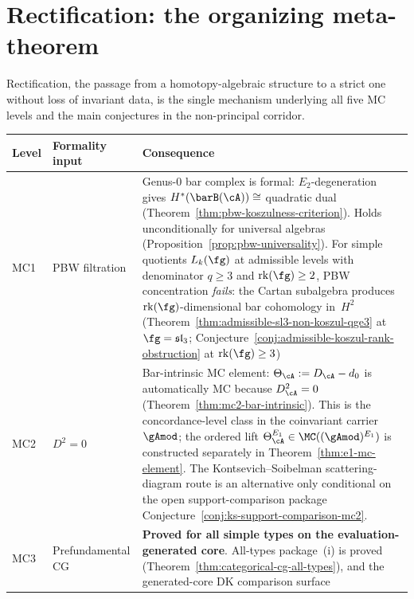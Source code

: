 \section{Rectification: the organizing meta-theorem}
\label{sec:concordance-rectification}

Rectification, the passage from a homotopy-algebraic structure
to a strict one without loss of invariant data, is the single
mechanism underlying all five MC levels and the main conjectures
in the non-principal corridor.

\begin{center}
\renewcommand{\arraystretch}{1.25}
\begin{tabular}{@{}llp{7.5cm}@{}}
\toprule
\textbf{Level} & \textbf{Formality input} & \textbf{Consequence} \\
\midrule
MC1 & PBW filtration & Genus-$0$ bar complex is formal:
 $E_2$-degeneration gives $H^*(\barB(\cA)) \cong$ quadratic dual
 (Theorem~\ref{thm:pbw-koszulness-criterion}).
 Holds unconditionally for universal algebras
 (Proposition~\ref{prop:pbw-universality}).
 For simple quotients $L_k(\fg)$ at admissible levels with
 denominator $q \geq 3$ and $\mathrm{rk}(\fg) \geq 2$,
 PBW concentration \emph{fails}: the Cartan subalgebra produces
 $\mathrm{rk}(\fg)$-dimensional bar cohomology in~$H^2$
 (Theorem~\ref{thm:admissible-sl3-non-koszul-qge3} at
 $\fg = \mathfrak{sl}_3$;
 Conjecture~\ref{conj:admissible-koszul-rank-obstruction} at
 $\mathrm{rk}(\fg) \geq 3$) \\
MC2 & $D^2 = 0$ & Bar-intrinsic MC element: $\Theta_\cA := D_\cA - d_0$
is automatically MC because $D_\cA^2 = 0$
(Theorem~\ref{thm:mc2-bar-intrinsic}).
 This is the concordance-level class in the coinvariant carrier
 $\gAmod$; the ordered lift
 $\Theta_\cA^{E_1}\in\MC((\gAmod)^{E_1})$
 is constructed separately in
 Theorem~\ref{thm:e1-mc-element}.  The
 Kontsevich--Soibelman scattering-diagram route is an alternative only
 conditional on the open support-comparison package
 Conjecture~\ref{conj:ks-support-comparison-mc2}. \\
MC3 & Prefundamental CG & \textbf{Proved for all simple types on the evaluation-generated core}.
 All-types package~(i) is proved
 (Theorem~\ref{thm:categorical-cg-all-types}),
 and the generated-core DK comparison surface

\end{tabular}
\end{center}
